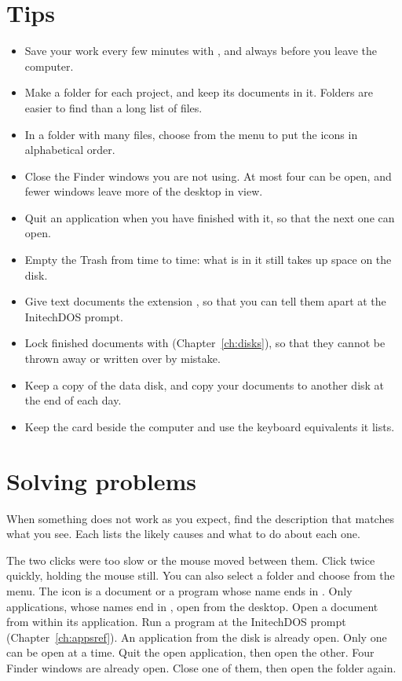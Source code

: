 \section{Tips}
\begin{itemize}
\item Save your work every few minutes with , and always
  before you leave the computer.
\item Make a folder for each project, and keep its documents in it.
  Folders are easier to find than a long list of files.
\item In a folder with many files, choose 
  from the  menu to put the icons in alphabetical order.
\item Close the Finder windows you are not using.  At most four can be
  open, and fewer windows leave more of the desktop in view.
\item Quit an application when you have finished with it, so that the
  next one can open.
\item Empty the Trash from time to time: what is in it still takes up
  space on the disk.
\item Give text documents the extension , so that you can tell
  them apart at the InitechDOS prompt.
\item Lock finished documents with  (Chapter~\ref{ch:disks}),
  so that they cannot be thrown away or written over by mistake.
\item Keep a copy of the data disk, and copy your documents to another
  disk at the end of each day.
\item Keep the  card beside the computer
  and use the keyboard equivalents it lists.
\end{itemize}

\section{Solving problems}
When something does not work as you expect, find the description that
matches what you see.  Each lists the likely causes and what to do about
each one.

\Cause The two clicks were too slow or the mouse moved between them.
\Solution Click twice quickly, holding the mouse still.  You can also
select a folder and choose  from the  menu.
\Cause The icon is a document or a program whose name ends in .
\Solution Only applications, whose names end in , open from the
desktop.  Open a document from within its application.  Run a 
program at the InitechDOS prompt (Chapter~\ref{ch:appsref}).
\Cause An application from the disk is already open.
\Solution Only one can be open at a time.  Quit the open application,
then open the other.
\Cause Four Finder windows are already open.
\Solution Close one of them, then open the folder again.

